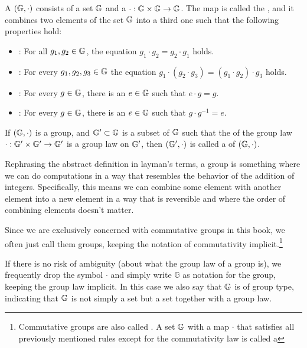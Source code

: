 
\begin{definition}
\label{def:commutative_group}
A  $(\mathbb{G},\cdot) $ consists of a set $\mathbb{G}$ and a  $\cdot:\mathbb{G} \times \mathbb{G} \to \mathbb{G} $. The map is called the , and it combines two elements of the set $ \mathbb{G}$ into a third one such that the following properties hold:
\begin{itemize}
\item {}: For all $g_1,g_2\in\mathbb{G}$, the equation $g_1\cdot g_2=g_2\cdot g_1$ holds.
\item {}: For every $g_1,g_2,g_3\in\mathbb{G}$ the equation
$g_1\cdot(g_2\cdot g_3) = (g_1\cdot g_2)\cdot g_3$ holds.
\item {}:  For every $g\in\mathbb{G}$, there is an $e\in\mathbb{G}$ such that $e\cdot g=g$.
\item {}: For every $g\in\mathbb{G}$, there is an $e\in\mathbb{G}$ such that $g\cdot g^{-1}=e$.
\end{itemize}
If $(\mathbb{G},\cdot)$ is a group, and $\mathbb{G}'\subset\mathbb{G}$ is a subset of $\mathbb{G}$ such that the  of the group law $\cdot: \mathbb{G}'\times \mathbb{G}' \to \mathbb{G}'$ is a group law on $\mathbb{G}'$, then $(\mathbb{G}',\cdot)$ is called a  of $(\mathbb{G},\cdot)$.
\end{definition}

Rephrasing the abstract definition in layman's terms, a group is something where we can do computations in a way that resembles the behavior of the addition of integers. Specifically, this means we can combine some element with another element into a new element in a way that is reversible and where the order of combining elements doesn't matter.

\begin{notation}Since we are exclusively concerned with commutative groups in this book, we often just call them groups, keeping the notation of commutativity implicit.\footnote{Commutative groups are also called . A set $\mathbb{G}$ with a map $\cdot$ that satisfies all previously mentioned rules except for the commutativity law is called a } 

If there is no risk of ambiguity (about what the group law of a group is), we frequently drop the symbol $\cdot$ and simply write $\mathbb{G}$ as notation for the group, keeping the group law implicit. In this case we also say that $\mathbb{G}$ is of group type, indicating that $\mathbb{G}$ is not simply a set but a set together with a group law.
\end{notation}

